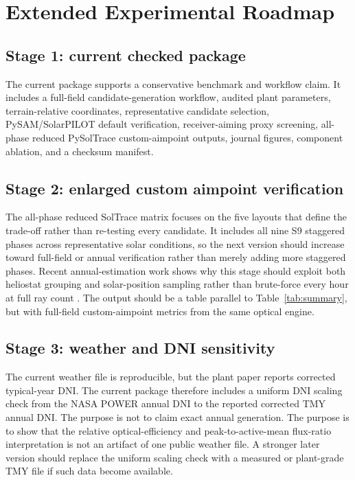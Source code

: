\documentclass[final,3p,times]{elsarticle}
\begin{document}
\section{Extended Experimental Roadmap}
\subsection{Stage 1: current checked package}
The current package supports a conservative benchmark and workflow claim. It includes a full-field candidate-generation workflow, audited plant parameters, terrain-relative coordinates, representative candidate selection, PySAM/SolarPILOT default verification, receiver-aiming proxy screening, all-phase reduced PySolTrace custom-aimpoint outputs, journal figures, component ablation, and a checksum manifest.

\subsection{Stage 2: enlarged custom aimpoint verification}
The all-phase reduced SolTrace matrix focuses on the five layouts that define the trade-off rather than re-testing every candidate. It includes all nine S9 staggered phases across representative solar conditions, so the next version should increase toward full-field or annual verification rather than merely adding more staggered phases. Recent annual-estimation work shows why this stage should exploit both heliostat grouping and solar-position sampling rather than brute-force every hour at full ray count \cite{liu2026fastannual}. The output should be a table parallel to Table~\ref{tab:summary}, but with full-field custom-aimpoint metrics from the same optical engine.

\subsection{Stage 3: weather and DNI sensitivity}
The current weather file is reproducible, but the plant paper reports corrected typical-year DNI. The current package therefore includes a uniform DNI scaling check from the NASA POWER annual DNI to the reported corrected TMY annual DNI. The purpose is not to claim exact annual generation. The purpose is to show that the relative optical-efficiency and peak-to-active-mean flux-ratio interpretation is not an artifact of one public weather file. A stronger later version should replace the uniform scaling check with a measured or plant-grade TMY file if such data become available.
\end{document}
